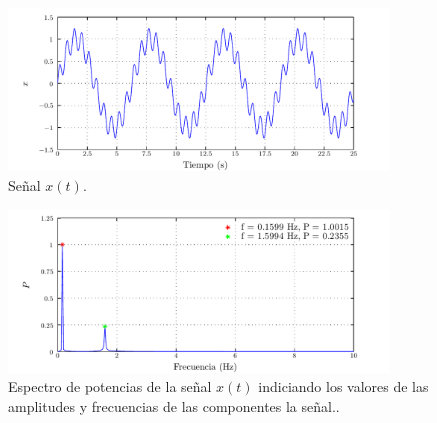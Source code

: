 \documentclass[a4paper,12pt,final]{article}
\begin{document}
      \newpage
      \vspace{-1em}
      \begin{listing}[H]
        \label{scr:1.1c}
        \inputminted[firstline=82]{matlab}{./laboratorio_5/problema01.m}
      \end{listing}

      \begin{figure}[H]
        \begin{center}
          \caption{Señal $x\left(t\right)$.}
          \label{p1f1}
          \vspace{-1em}
          \includegraphics[width=0.9\textwidth]{./laboratorio_5/problema01_signal.pdf}
        \end{center}
      \end{figure}

      \begin{figure}[H]
        \begin{center}
          \caption{Espectro de potencias de la señal $x\left(t\right)$ indiciando los valores de las amplitudes y frecuencias de las componentes la señal..}
          \label{p1f2}
          \vspace{-1em}
          \includegraphics[width=0.9\textwidth]{./laboratorio_5/problema01_power_spectrum.pdf}
        \end{center}
      \end{figure}
\end{document}
